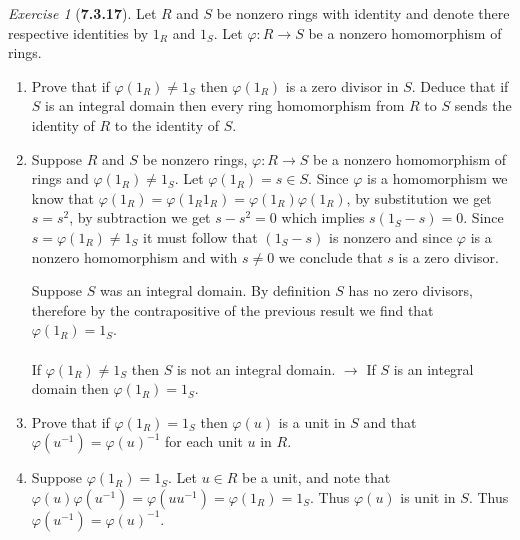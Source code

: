 \documentclass[12pt]{amsart}
\makeatletter
\theoremstyle{remark}
\newtheorem*{exercise}{Exercise}%
\renewenvironment{proof}[1][\proofname]{\par\doublespacing
  \pushQED{\qed}%
  \normalfont \topsep6\p@\@plus6\p@\relax
  \list{}{%
    \settowidth{\leftmargin}{\itshape\proofname:\hskip\labelsep}%
    \setlength{\labelwidth}{0pt}%
    \setlength{\itemindent}{-\leftmargin}%
  }%
  \item[\hskip\labelsep\itshape#1\@addpunct{:}]\ignorespaces
}{%
  \popQED\endlist\@endpefalse
  \singlespacing
}
\theoremstyle{mycomment}
\makeatother
\begin{document}
\begin{exercise}[\textbf{7.3.17}] Let $R$ and $S$ be nonzero rings with identity and denote there respective identities by $1_R$ and $1_S$.
  Let $\varphi: R \to S$ be a nonzero homomorphism of rings. 
  \begin{enumerate}
    \item[a.] Prove that if $\varphi(1_R) \neq 1_S$ then $\varphi(1_R)$ is a zero divisor in $S$. Deduce that if $S$ is an integral domain
    then every ring homomorphism from $R$ to $S$ sends the identity of $R$ to the identity of $S$. 
    \begin{proof} Suppose $R$ and $S$ be nonzero rings, $\varphi: R \to S$ be a nonzero homomorphism of rings and $\varphi(1_R) \neq 1_S$.
      Let $\varphi(1_R) = s \in S$. Since $\varphi$ is a homomorphism we know that $\varphi(1_R) = \varphi(1_R1_R) = \varphi(1_R)\varphi(1_R)$, by substitution we get
      $s = s^2$, by subtraction we get $s - s^2 = 0$ which implies $s(1_S - s) = 0$. Since $s = \varphi(1_R) \neq 1_S$ it must follow that $(1_S - s)$ is nonzero and since
      $\varphi$ is a nonzero homomorphism and with $s \neq 0$ we conclude that $s$ is a zero divisor. 


      Suppose $S$ was an integral domain. By definition $S$ has no zero divisors, therefore by the contrapositive of the previous result we find that $\varphi(1_R)  =  1_S$.\\\\
      If $\varphi(1_R) \neq 1_S$ then $S$ is not an integral domain. $\to$ If $S$ is an integral domain then $\varphi(1_R) = 1_S$.
    \end{proof}
    \vspace{.15in}

    \item[b.] Prove that if $\varphi(1_R) = 1_S$ then $\varphi(u)$ is a unit in $S$ and that $\varphi(u^{-1}) = \varphi(u)^{-1}$ for each unit $u$ in $R$. 
    \begin{proof} Suppose $\varphi(1_R) = 1_S$. Let $u \in R$ be a unit, and note that $\varphi(u)\varphi(u^{-1}) = \varphi(uu^{-1}) = \varphi(1_R) = 1_S$. Thus $\varphi(u)$ is 
      unit in $S$. Thus $\varphi(u^{-1}) = \varphi(u)^{-1}$.
    \end{proof}
    \vspace{.15in}

  \end{enumerate}
\end{exercise}
\vspace{.5in}
\end{document}
